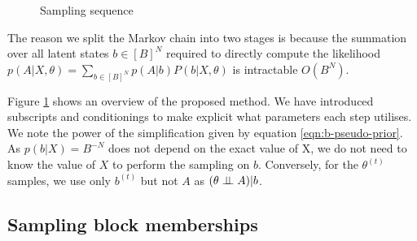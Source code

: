 \begin{figure}[!h]
	\centering

	\caption{Sampling sequence}
	\label{fig:samp-sequence}
\end{figure}

The reason we split the Markov chain into two stages is because the summation over all latent states $b \in [B]^N$ required to directly compute the likelihood $p(A| X, \theta) = \sum_{b \in [B]^N} p(A | b) P(b | X, \theta)$ is intractable $O(B^N)$.

Figure \ref{fig:samp-sequence} shows an overview of the proposed method. We have introduced subscripts and conditionings to make explicit what parameters each step utilises. We note the power of the simplification given by equation \ref{eqn:b-pseudo-prior}. As $p(b| X) = B^{-N}$ does not depend on the exact value of X, we do not need to know the value of $X$ to perform the sampling on $b$. Conversely, for the $\theta^{(t)}$ samples, we use only $b^{(t)}$ but not $A$ as $(\theta \perp \!\!\! \perp A) | b$.

\FloatBarrier

\subsection{Sampling block memberships}

